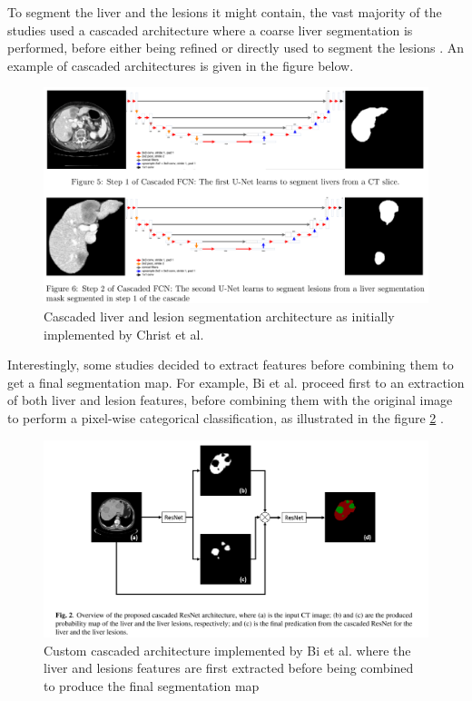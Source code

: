 \documentclass[]{article}
\begin{document}
	To segment the liver and the lesions it might contain, the vast majority
	of the studies used a cascaded architecture where a coarse liver
	segmentation is performed, before either being refined \cite{Yuan2017} or directly used to segment the lesions \cite{Han2017, Li2018, Kaluva2018, Ben-Cohen, Christ2017}. An example of cascaded architectures is
	given in the figure below. 
	\begin{figure}[th!]
		\centering
		\includegraphics[width=0.7\linewidth]{images/image35}
		\caption{Cascaded liver and lesion segmentation architecture as initially implemented by Christ et al. \cite{Christ2017}}
		\label{Cascade_Christ}
	\end{figure}
	
	Interestingly, some studies decided to extract features before combining
	them to get a final segmentation map. For example, Bi et al.
	proceed first to an extraction of both liver and lesion features, before
	combining them with the original image to perform a pixel-wise
	categorical classification, as illustrated in the figure \ref{Bi2017_Fig2} \cite{Bi2017}.
	
	\begin{figure}[th!]
		\centering
		\includegraphics[width=0.7\linewidth]{images/image27}
		\caption{Custom cascaded architecture implemented by Bi et al. where the liver and lesions features are first extracted before being combined to produce the final segmentation map \cite{Bi2017}}
		\label{Bi2017_Fig2}
	\end{figure}
	
\end{document}
